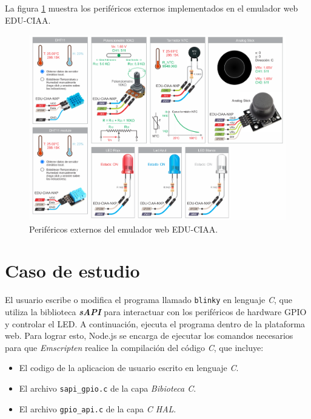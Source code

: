 La figura \ref{fig:perifericosCIAA} muestra los periféricos externos implementados en el emulador web EDU-CIAA.

\begin{figure}[ht]
	\centering
	\includegraphics[scale=.40]{./Figures/perifericosCIAA.png}
	\caption{Periféricos externos del emulador web EDU-CIAA.}
	\label{fig:perifericosCIAA}
\end{figure}


\hfill \break
\hfill \break
\hfill \break
\hfill \break
\hfill \break
\hfill \break
\hfill \break
\hfill \break

\section{Caso de estudio}
\label{sec:caso_de_estudio}

El usuario escribe o modifica el programa llamado \texttt{blinky} en lenguaje \textit{C}, que utiliza la biblioteca \textit{\textbf{sAPI}} para interactuar con los periféricos de hardware GPIO y controlar el LED. A continuación, ejecuta el programa dentro de la plataforma web. Para lograr esto, Node.js se encarga de ejecutar los comandos necesarios para que \textit{Emscripten} realice la compilación del código \textit{C}, que incluye: 

\begin{itemize}
	\item El codigo de la aplicacion de usuario escrito en lenguaje \textit{C}.
	\item El archivo \texttt{sapi\_gpio.c} de la capa \textit{Bibioteca C}.
	\item El archivo \texttt{gpio\_api.c} de la capa \textit{C HAL}.
\end{itemize} 

